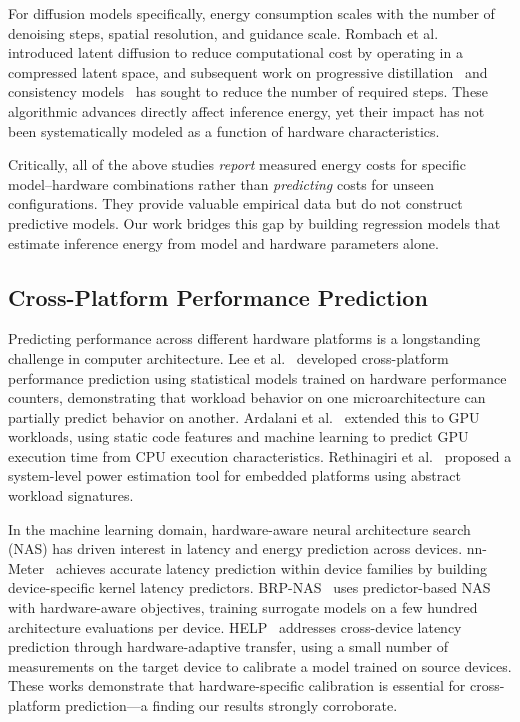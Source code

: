\documentclass{ieeeaccess}
\begin{document}
For diffusion models specifically, energy consumption scales with the number of denoising steps, spatial resolution, and guidance scale.
Rombach et al.~\cite{rombach2022high} introduced latent diffusion to reduce computational cost by operating in a compressed latent space, and subsequent work on progressive distillation~\cite{salimans2022progressive} and consistency models~\cite{song2023consistency} has sought to reduce the number of required steps.
These algorithmic advances directly affect inference energy, yet their impact has not been systematically modeled as a function of hardware characteristics.

Critically, all of the above studies \emph{report} measured energy costs for specific model--hardware combinations rather than \emph{predicting} costs for unseen configurations.
They provide valuable empirical data but do not construct predictive models.
Our work bridges this gap by building regression models that estimate inference energy from model and hardware parameters alone.

\subsection{Cross-Platform Performance Prediction}
\label{sec:rw_cross_platform}

Predicting performance across different hardware platforms is a longstanding challenge in computer architecture.
Lee et al.~\cite{lee2006accurate} developed cross-platform performance prediction using statistical models trained on hardware performance counters, demonstrating that workload behavior on one microarchitecture can partially predict behavior on another.
Ardalani et al.~\cite{ardalani2015cross} extended this to GPU workloads, using static code features and machine learning to predict GPU execution time from CPU execution characteristics.
Rethinagiri et al.~\cite{rethinagiri2014system} proposed a system-level power estimation tool for embedded platforms using abstract workload signatures.

In the machine learning domain, hardware-aware neural architecture search (NAS) has driven interest in latency and energy prediction across devices.
nn-Meter~\cite{zhang2021nnmeter} achieves accurate latency prediction within device families by building device-specific kernel latency predictors.
BRP-NAS~\cite{dudziak2020brpnas} uses predictor-based NAS with hardware-aware objectives, training surrogate models on a few hundred architecture evaluations per device.
HELP~\cite{lee2021help} addresses cross-device latency prediction through hardware-adaptive transfer, using a small number of measurements on the target device to calibrate a model trained on source devices.
These works demonstrate that hardware-specific calibration is essential for cross-platform prediction---a finding our results strongly corroborate.
\end{document}

